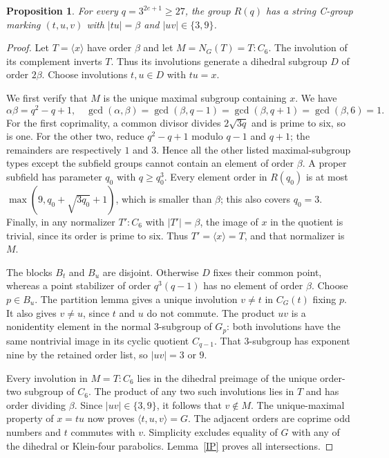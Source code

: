 \documentclass[11pt,a4paper]{article}
\newtheorem{proposition}[lemma]{Proposition}
\newcommand{\gen}[1]{\langle #1\rangle}
\begin{document}
\begin{proposition}\label{generation}
For every $q=3^{2e+1}\ge27$, the group $R(q)$ has a string C-group
marking $(t,u,v)$ with $|tu|=\beta$ and $|uv|\in\{3,9\}$.
\end{proposition}
\begin{proof}
Let $T=\gen x$ have order $\beta$ and let $M=N_G(T)=T:C_6$.
The involution of its complement inverts $T$. Thus its involutions
generate a dihedral subgroup $D$ of order $2\beta$. Choose involutions
$t,u\in D$ with $tu=x$.

We first verify that $M$ is the unique maximal subgroup containing
$x$. We have
\[
 \alpha\beta=q^2-q+1,
 \quad\gcd(\alpha,\beta)=\gcd(\beta,q-1)
 =\gcd(\beta,q+1)=\gcd(\beta,6)=1.
\]
For the first coprimality, a common divisor divides $2\sqrt{3q}$ and
is prime to six, so is one. For the other two, reduce $q^2-q+1$
modulo $q-1$ and $q+1$; the remainders are respectively $1$ and $3$.
Hence all the other listed maximal-subgroup types except the subfield
groups cannot contain an element of order $\beta$. A proper subfield has parameter $q_0$ with $q\ge q_0^3$.
Every element order in $R(q_0)$ is at most
$\max(9,q_0+\sqrt{3q_0}+1)$, which is smaller than $\beta$; this
also covers $q_0=3$. Finally, in any normalizer $T':C_6$ with
$|T'|=\beta$, the image of $x$ in the quotient is trivial, since its
order is prime to six. Thus $T'=\gen x=T$, and that normalizer is $M$.

The blocks $B_t$ and $B_u$ are disjoint. Otherwise $D$ fixes their
common point, whereas a point stabilizer of order $q^3(q-1)$ has
no element of order $\beta$. Choose $p\in B_u$. The partition lemma
gives a unique involution $v\ne t$ in $C_G(t)$ fixing $p$.
It also gives $v\ne u$, since $t$ and $u$ do not commute. The product
$uv$ is a nonidentity element in the normal $3$-subgroup of $G_p$:
both involutions have the same nontrivial image in its cyclic quotient
$C_{q-1}$. That $3$-subgroup has exponent nine by the retained order
list, so $|uv|=3$ or $9$.

Every involution in $M=T:C_6$ lies in the dihedral preimage of the
unique order-two subgroup of $C_6$. The product of any two such
involutions lies in $T$ and has order dividing $\beta$. Since
$|uv|\in\{3,9\}$, it follows that $v\notin M$. The unique-maximal
property of $x=tu$ now proves $\gen{t,u,v}=G$.
The adjacent orders are coprime odd numbers and $t$ commutes with
$v$. Simplicity excludes equality of $G$ with any of the dihedral
or Klein-four parabolics. Lemma~\ref{IP} proves all intersections.
\end{proof}
\end{document}
